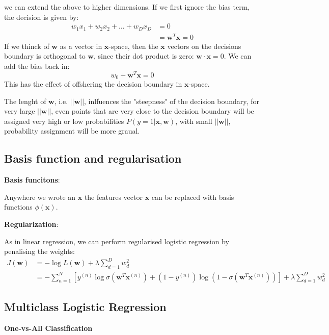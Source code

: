 \documentclass[a4paper, 11pt]{article}
\begin{document}
we can extend the above to higher dimensions. If we first ignore the bias term, the decision is given by:
\begin{align*}
        w_1x_1 + w_2x_2 + \dots + w_Dx_D &= 0\\
        &=\mathbf{w}^{T}\mathbf{x} = 0
\end{align*}
If we thinck of $\mathbf{w}$ as a vector in $\mathbf{x}$-space, then the $\mathbf{x}$ vectors on the decisions boundary is
orthogonal to $\mathbf{w}$, since their dot product is zero: $\mathbf{w}\cdot\mathbf{x} = 0$. We can add the bias back in:
\begin{equation}
        w_0 + \mathbf{w}^{T}\mathbf{x} = 0
\end{equation}
This has the effect of offshering the decision boundary in $\mathbf{x}$-space.

The lenght of $\mathbf{w}$, i.e. $||\mathbf{w}||$, inlfuences the "steepness" of the decision boundary, for very large $||\mathbf{w}||$, even points that are very
close to the decision boundary will be assigned very high or low probabilities $P(y = 1|\mathbf{x}, \mathbf{w})$, with small $||\mathbf{w}||$, probability assignment will be more graual.

\subsection{Basis function and regularisation}
\textbf{Basis funcitons}:

Anywhere we wrote an $\mathbf{x}$ the features vector $\mathbf{x}$ can be replaced with basis functions $\phi(\mathbf{x})$.

\textbf{Regularization}:

As in linear regression, we can perform regularised logistic regression by penalising the weights:
\begin{align*}
        J(\mathbf{w}) &= -\log{L(\mathbf{w})} + \lambda\sum\limits_{d = 1}^{D}w_{d}^{2}\\
        &= - \sum\limits_{n = 1}^{N}[y^{(n)}\log{\sigma(\mathbf{w}^{T}\mathbf{x}^{(n)})} + (1 - y^{(n)})\log{(1 - \sigma(\mathbf{w}^{T}\mathbf{x}^{(n)}))}] + \lambda\sum\limits_{d = 1}^{D} w_{d}^{2}
\end{align*}

\subsection{Multiclass Logistic Regression}
{\Large\textbf{One-vs-All Classification}}
\end{document}
